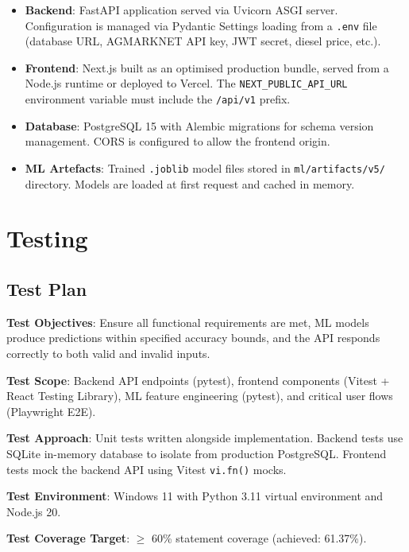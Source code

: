 \documentclass[12pt,a4paper]{report}
\begin{document}
\begin{itemize}
    \item \textbf{Backend}: FastAPI application served via Uvicorn ASGI server. Configuration
    is managed via Pydantic Settings loading from a \texttt{.env} file (database URL,
    AGMARKNET API key, JWT secret, diesel price, etc.).
    \item \textbf{Frontend}: Next.js built as an optimised production bundle, served from
    a Node.js runtime or deployed to Vercel. The \texttt{NEXT\_PUBLIC\_API\_URL} environment
    variable must include the \texttt{/api/v1} prefix.
    \item \textbf{Database}: PostgreSQL 15 with Alembic migrations for schema version
    management. CORS is configured to allow the frontend origin.
    \item \textbf{ML Artefacts}: Trained \texttt{.joblib} model files stored in
    \texttt{ml/artifacts/v5/} directory. Models are loaded at first request and cached
    in memory.
\end{itemize}

\chapter{Testing}

\section{Test Plan}

\textbf{Test Objectives}: Ensure all functional requirements are met, ML models produce
predictions within specified accuracy bounds, and the API responds correctly to both valid
and invalid inputs.

\textbf{Test Scope}: Backend API endpoints (pytest), frontend components (Vitest + React
Testing Library), ML feature engineering (pytest), and critical user flows (Playwright E2E).

\textbf{Test Approach}: Unit tests written alongside implementation. Backend tests use
SQLite in-memory database to isolate from production PostgreSQL. Frontend tests mock the
backend API using Vitest \texttt{vi.fn()} mocks.

\textbf{Test Environment}: Windows 11 with Python 3.11 virtual environment and Node.js 20.

\textbf{Test Coverage Target}: $\geq$ 60\% statement coverage (achieved: 61.37\%).
\end{document}
